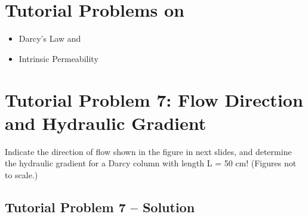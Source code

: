 \documentclass[letterpaper,10pt,english]{jupyterBook}
\begin{document}
\section{Tutorial Problems on}
\label{\detokenize{content/tutorials/T3/tutorial_03:tutorial-problems-on}}\begin{itemize}
\item {} 
\sphinxAtStartPar
Darcy’s Law and

\item {} 
\sphinxAtStartPar
Intrinsic Permeability

\end{itemize}


\section{Tutorial Problem 7: Flow Direction and Hydraulic Gradient}
\label{\detokenize{content/tutorials/T3/tutorial_03:tutorial-problem-7-flow-direction-and-hydraulic-gradient}}
\sphinxAtStartPar
Indicate the direction of flow shown in the figure in next slides, and determine the hydraulic gradient for a Darcy column with length L = 50 cm! (Figures not to scale.)


\subsection{Tutorial Problem 7 – Solution}
\label{\detokenize{content/tutorials/T3/tutorial_03:tutorial-problem-7-solution}}
\sphinxAtStartPar
{}
\end{document}
